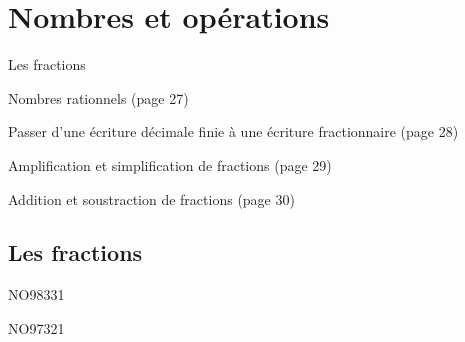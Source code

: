 \documentclass[a4paper,11pt]{report}
\begin{document}
\newcommand{\chapterName}{Nombres et opérations}
\newcommand{\serieName}{Les fractions}

\chapter*{\chapterName}
\thispagestyle{empty}

\begin{amL}{\serieName}{
\item Nombres rationnels (page 27)
\item Passer d'une écriture décimale finie à une écriture fractionnaire (page 28)
\item Amplification et simplification de fractions (page 29)
\item Addition et soustraction de fractions (page 30)
}
\end{amL}
\section*{\serieName}
\setcounter{page}{1}







\begin{QSJ}{30}{1}
\end{QSJ}


\begin{exof}{NO98}{33}{1}
\end{exof}
\begin{exof}{NO97}{32}{1}
\end{exof}
\end{document}
